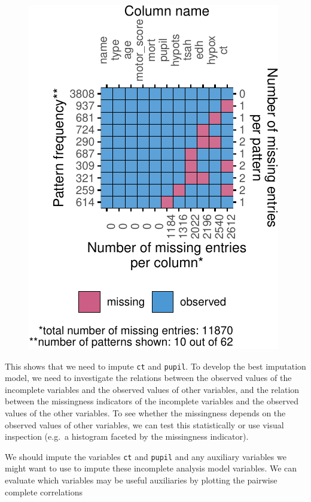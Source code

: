 \documentclass[
  article]{jss}
\begin{document}
\begin{figure}[h]

{\centering \includegraphics{manuscript_files/figure-pdf/unnamed-chunk-27-1.pdf}

}

\end{figure}

This shows that we need to impute \texttt{ct} and \texttt{pupil}. To
develop the best imputation model, we need to investigate the relations
between the observed values of the incomplete variables and the observed
values of other variables, and the relation between the missingness
indicators of the incomplete variables and the observed values of the
other variables. To see whether the missingness depends on the observed
values of other variables, we can test this statistically or use visual
inspection (e.g.~a histogram faceted by the missingness indicator).

We should impute the variables \texttt{ct} and \texttt{pupil} and any
auxiliary variables we might want to use to impute these incomplete
analysis model variables. We can evaluate which variables may be useful
auxiliaries by plotting the pairwise complete correlations
\end{document}
